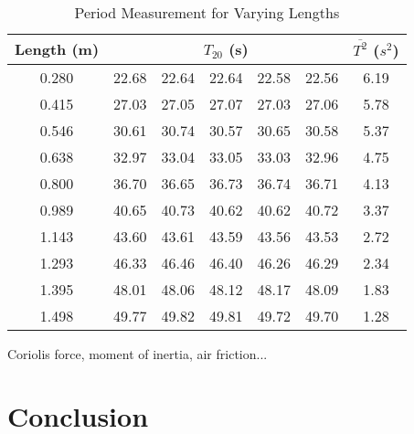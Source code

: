 \documentclass[iop]{emulateapj}
\begin{document}
\begin{figure*} 

\begin{table}[H]
\caption{Period Measurement for Varying Lengths} %
\centering %
\begin{tabular}{c rrrrr c} %
\hline\hline %
Length (m) & \multicolumn{5}{c}{$T_{20}$ (s)} & $\overline{T^2}$ ($s^2$)\\ [0.5ex]
\hline %
0.280 & 22.68 & 22.64 & 22.64 & 22.58 & 22.56 & 6.19\\ %
0.415 & 27.03 & 27.05 & 27.07 & 27.03 & 27.06 & 5.78\\
0.546 & 30.61 & 30.74 & 30.57 & 30.65 & 30.58 & 5.37\\
0.638 & 32.97 & 33.04 & 33.05 & 33.03 & 32.96 & 4.75\\
0.800 & 36.70 & 36.65 & 36.73 & 36.74 & 36.71 & 4.13\\
0.989 & 40.65 & 40.73 & 40.62 & 40.62 & 40.72 & 3.37\\
1.143 & 43.60 & 43.61 & 43.59 & 43.56 & 43.53 & 2.72\\
1.293 & 46.33 & 46.46 & 46.40 & 46.26 & 46.29 & 2.34\\
1.395 & 48.01 & 48.06 & 48.12 & 48.17 & 48.09 & 1.83\\
1.498 & 49.77 & 49.82 & 49.81 & 49.72 & 49.70 & 1.28\\ [1ex] %
\hline %
\end{tabular}
\label{tab:10lengths}
\end{table}
















Coriolis force, moment of inertia, air friction...














\section{Conclusion}















\end{figure*}
\end{document}
